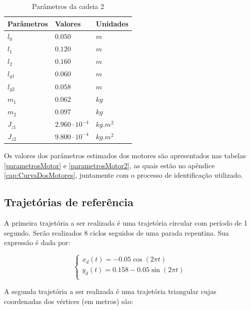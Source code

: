 \documentclass[]{politex}
\begin{document}
\begin{table}[H] 
\centering
\caption{Parâmetros da cadeia 2}
\label{tab:parametrosCadeia2}
\begin{tabular}{l|l|l}
Parâmetros   & Valores                    & Unidades   \\ \hline
$l_0$        & $0.050$                    & $m$        \\
$l_1$        & $0.120$                    & $m$        \\
$l_2$        & $0.160$                    & $m$        \\
$l_{g1}$     & $0.060$                    & $m$        \\
$l_{g2}$     & $0.058$                    & $m$        \\
$m_1$        & $0.062$                    & $kg$       \\
$m_2$        & $0.097$                    & $kg$       \\
$J_{z1}$     & $2.960   \cdot 10^{-4}$    & $kg.m^{2}$ \\
$J_{z2}$     & $9.800   \cdot 10^{-4}$    & $kg.m^{2}$ \\
\end{tabular}
\end{table}

Os valores dos parâmetros estimados dos motores são apresentados nas tabelas \ref{parametrosMotor} e \ref{parametrosMotor2}, as quais estão no apêndice \ref{cap:CurvaDosMotores}, juntamente com o processo de identificação utilizado.



\subsection{Trajetórias de referência}

A primeira trajetória a ser realizada é uma trajetória circular com período de 1 segundo. Serão realizados 8 ciclos seguidos de uma parada repentina. Sua expressão é dada por:

\begin{equation}
\begin{cases}
x_d(t) = -0.05 \cos(2\pi t) \\
y_d(t) = 0.158 - 0.05 \sin(2\pi t) \\
\end{cases}
\end{equation}

A segunda trajetória a ser realizada é uma trajetória triangular cujas coordenadas dos vértices (em metros) são:
\end{document}
